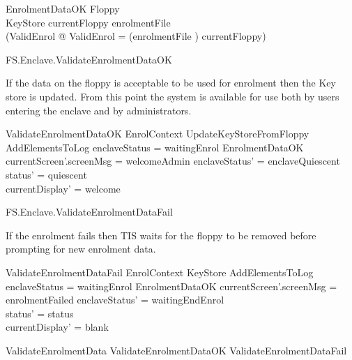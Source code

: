 \begin{schema}{EnrolmentDataOK}
        Floppy
\\      KeyStore
\where
        currentFloppy \in \ran enrolmentFile
\\      (\exists ValidEnrol @ \theta ValidEnrol = (enrolmentFile \inv) currentFloppy)
\end{schema}

\begin{traceunit}{FS.Enclave.ValidateEnrolmentDataOK}
\end{traceunit}


If the data on the floppy is acceptable to be used for enrolment then
the Key store is updated. From this point the system is available for
use both by users entering the enclave and by administrators.

\begin{schema}{ValidateEnrolmentDataOK}
        EnrolContext
\also
        UpdateKeyStoreFromFloppy
\\      AddElementsToLog
\where
        enclaveStatus = waitingEnrol
\also
        EnrolmentDataOK
\also
        currentScreen'.screenMsg = welcomeAdmin
\also
        enclaveStatus' = enclaveQuiescent 
\\      status' = quiescent
\\      currentDisplay' = welcome
\end{schema}

\begin{traceunit}{FS.Enclave.ValidateEnrolmentDataFail}
\end{traceunit}

If the enrolment fails then TIS waits for the floppy to be removed
before prompting for new enrolment data. 

\begin{schema}{ValidateEnrolmentDataFail}
        EnrolContext
\also
        \Xi KeyStore
\also
        AddElementsToLog
\where
        enclaveStatus = waitingEnrol
\also
        \lnot EnrolmentDataOK
\also
        currentScreen'.screenMsg = enrolmentFailed
\also
        enclaveStatus' = waitingEndEnrol
\\      status' = status
\\      currentDisplay' = blank
\end{schema}

\begin{zed}
        ValidateEnrolmentData  ValidateEnrolmentDataOK \lor
          ValidateEnrolmentDataFail
\end{zed}


